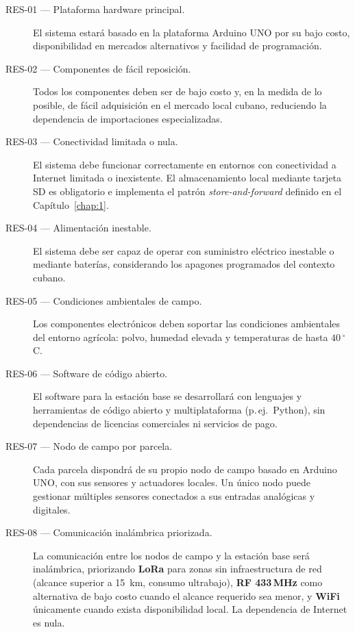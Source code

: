 \begin{description}
	
	\item[RES-01 — Plataforma hardware principal.]
	El sistema estará basado en la plataforma Arduino UNO por su bajo costo, disponibilidad
	en mercados alternativos y facilidad de programación.
	
	\item[RES-02 — Componentes de fácil reposición.]
	Todos los componentes deben ser de bajo costo y, en la medida de lo posible, de fácil
	adquisición en el mercado local cubano, reduciendo la dependencia de importaciones
	especializadas.
	
	\item[RES-03 — Conectividad limitada o nula.]
	El sistema debe funcionar correctamente en entornos con conectividad a Internet limitada
	o inexistente. El almacenamiento local mediante tarjeta SD es obligatorio e implementa
	el patrón \textit{store-and-forward} definido en el Capítulo~\ref{chap:1}.
	
	\item[RES-04 — Alimentación inestable.]
	El sistema debe ser capaz de operar con suministro eléctrico inestable o mediante
	baterías, considerando los apagones programados del contexto cubano.
	
	\item[RES-05 — Condiciones ambientales de campo.]
	Los componentes electrónicos deben soportar las condiciones ambientales del entorno
	agrícola: polvo, humedad elevada y temperaturas de hasta \(40\,^\circ\)C.
	
	\item[RES-06 — Software de código abierto.]
	El software para la estación base se desarrollará con lenguajes y herramientas de código
	abierto y multiplataforma (p.\,ej.\ Python), sin dependencias de licencias comerciales
	ni servicios de pago.
	
	\item[RES-07 — Nodo de campo por parcela.]
	Cada parcela dispondrá de su propio nodo de campo basado en Arduino UNO, con sus
	sensores y actuadores locales. Un único nodo puede gestionar múltiples sensores
	conectados a sus entradas analógicas y digitales.
	
	\item[RES-08 — Comunicación inalámbrica priorizada.]
	La comunicación entre los nodos de campo y la estación base será inalámbrica,
	priorizando \textbf{LoRa} para zonas sin infraestructura de red (alcance superior a
	15~km, consumo ultrabajo), \textbf{RF 433\,MHz} como alternativa de bajo costo cuando
	el alcance requerido sea menor, y \textbf{WiFi} únicamente cuando exista disponibilidad
	local. La dependencia de Internet es nula.
	

\end{description}
